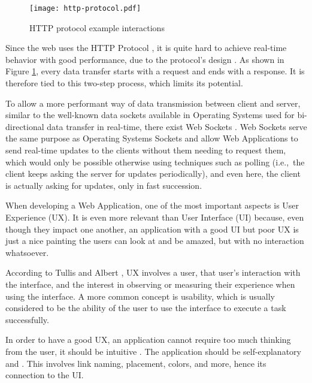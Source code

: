 \begin{figure}[t]
    \begin{center}
      \leavevmode
      \texttt{[image: http-protocol.pdf]}
      \caption{HTTP protocol example interactions}
      \label{fig:http-protocol}
    \end{center}
  \end{figure}

Since the web uses the HTTP Protocol \cite{http1-1protocol} \cite{http2protocol}, it is quite hard to achieve real-time behavior with good performance, due to the protocol's design \cite{Spero1994}. As shown in Figure \ref{fig:http-protocol}, every data transfer starts with a request and ends with a response. It is therefore tied to this two-step process, which limits its potential. 

To allow a more performant way of data transmission between client and server, similar to the well-known data sockets available in Operating Systems used for bi-directional data transfer in real-time, there exist Web Sockets \cite{websocket-protocol}. Web Sockets serve the same purpose as Operating Systems Sockets and allow Web Applications to send real-time updates to the clients without them needing to request them, which would only be possible otherwise using techniques such as polling (i.e.,\ the client keeps asking the server for updates periodically), and even here, the client is actually asking for updates, only in fast succession.

When developing a Web Application, one of the most important aspects is User Experience (UX). It is even more relevant than User Interface (UI) because, even though they impact one another, an application with a good UI but poor UX is just a nice painting the users can look at and be amazed, but with no interaction whatsoever.

According to Tullis and Albert \cite{measuring-user-experience-tullis}, UX involves a user, that user's interaction with the interface, and the interest in observing or measuring their experience when using the interface. A more common concept is usability, which is usually considered to be the ability of the user to use the interface to execute a task successfully.

In order to have a good UX, an application cannot require too much thinking from the user, it should be intuitive \cite{Krug2013-ux}. The application should be self-explanatory and . This involves link naming, placement, colors, and more, hence its connection to the UI.

